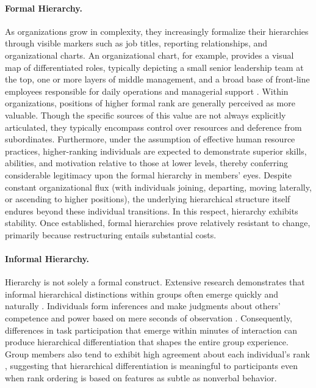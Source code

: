 \paragraph{Formal Hierarchy.}

As organizations grow in complexity, they increasingly formalize their hierarchies through visible markers such as job titles, reporting relationships, and organizational charts. An organizational chart, for example, provides a visual map of differentiated roles, typically depicting a small senior leadership team at the top, one or more layers of middle management, and a broad base of front-line employees responsible for daily operations and managerial support \citep{Mintzberg-1979-Structuring}. Within organizations, positions of higher formal rank are generally perceived as more valuable. Though the specific sources of this value are not always explicitly articulated, they typically encompass control over resources and deference from subordinates. Furthermore, under the assumption of effective human resource practices, higher-ranking individuals are expected to demonstrate superior skills, abilities, and motivation relative to those at lower levels, thereby conferring considerable legitimacy upon the formal hierarchy in members' eyes. Despite constant organizational flux (with individuals joining, departing, moving laterally, or ascending to higher positions), the underlying hierarchical structure itself endures beyond these individual transitions. In this respect, hierarchy exhibits stability. Once established, formal hierarchies prove relatively resistant to change, primarily because restructuring entails substantial costs.

\paragraph{Informal Hierarchy.}

Hierarchy is not solely a formal construct. Extensive research demonstrates that informal hierarchical distinctions within groups often emerge quickly and naturally \citep{Anderson-2001-Who, Bales-1951-Channels, Berger-1980-Status, Mast-2002-Dominance}. Individuals form inferences and make judgments about others' competence and power based on mere seconds of observation \citep{Ambady-1993-Half, Magee-2009-Seeing, Todorov-2005-Inferences}. Consequently, differences in task participation that emerge within minutes of interaction \citep{Fisek-1970-Process} can produce hierarchical differentiation that shapes the entire group experience. Group members also tend to exhibit high agreement about each individual's rank \citep{Mast-2004-Who}, suggesting that hierarchical differentiation is meaningful to participants even when rank ordering is based on features as subtle as nonverbal behavior.

